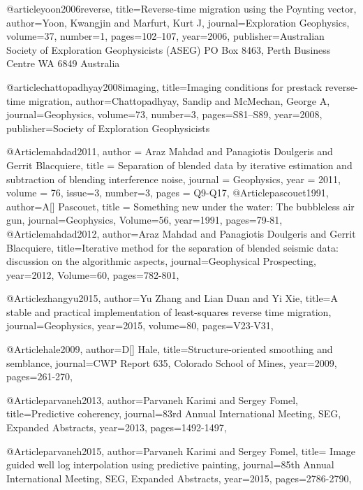 @article{yoon2006reverse,
  title={Reverse-time migration using the Poynting vector},
  author={Yoon, Kwangjin and Marfurt, Kurt J},
  journal={Exploration Geophysics},
  volume={37},
  number={1},
  pages={102--107},
  year={2006},
  publisher={Australian Society of Exploration Geophysicists (ASEG) PO Box 8463, Perth Business Centre WA 6849 Australia}
}

@article{chattopadhyay2008imaging,
  title={Imaging conditions for prestack reverse-time migration},
  author={Chattopadhyay, Sandip and McMechan, George A},
  journal={Geophysics},
  volume={73},
  number={3},
  pages={S81--S89},
  year={2008},
  publisher={Society of Exploration Geophysicists}
}

@Article{mahdad2011,
  author = 	 {Araz Mahdad and Panagiotis Doulgeris and Gerrit Blacquiere},
  title = 	 {Separation of blended data by iterative estimation and subtraction of blending interference noise},
  journal = 	 {Geophysics},
  year = 	 2011,
  volume =	 76,
  issue=3,
  number=3,
  pages =	 {Q9-Q17},
}
@Article{pascouet1991,
  author={A[] Pascouet},
  title = {Something new under the water: The bubbleless air gun},
  journal={Geophysics},
  Volume=56,
  year=1991,
  pages={79-81},
}
@Article{mahdad2012,
  author={Araz Mahdad and Panagiotis Doulgeris and Gerrit Blacquiere},
  title={Iterative method for the separation of blended seismic data: discussion on the algorithmic aspects},
  journal={Geophysical Prospecting},
  year=2012,
  Volume=60,
  pages={782-801},
}



@Article{zhangyu2015,
  author={Yu Zhang and Lian Duan and Yi Xie},
  title={A stable and practical implementation of least-squares reverse time migration},
  journal={Geophysics},
  year=2015,
  volume=80,
  pages={V23-V31},
}
	




@Article{hale2009,
  author={D[] Hale},
  title={Structure-oriented smoothing and semblance},
  journal={CWP Report 635, Colorado School of Mines},
  year=2009,
  pages={261-270},
}


@Article{parvaneh2013,
  author={Parvaneh Karimi and Sergey Fomel},
  title={Predictive coherency},
  journal={83rd Annual International Meeting, SEG, Expanded Abstracts},
  year=2013,
  pages={1492-1497},
}

@Article{parvaneh2015,
  author={Parvaneh Karimi and Sergey Fomel},
  title={	Image guided well log interpolation using predictive painting},
  journal={85th Annual International Meeting, SEG, Expanded Abstracts},
  year=2015,
  pages={2786-2790},
}

